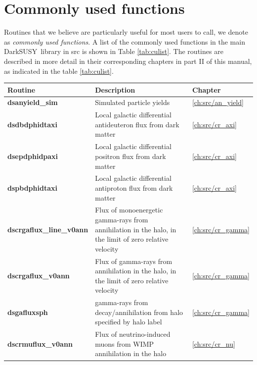 \documentclass[a4paper,10pt,oneside]{book}
\newcommand{\code}[1]{\ft{#1}}
\newcommand{\ds}{{\sffamily DarkSUSY}}
\newcommand{\ft}[1]{\textsf{#1}}
\newcommand{\ftb}[1]{{\bfseries \sffamily #1}}
\begin{document}
\section{Commonly used functions}

Routines that we believe are particularly  useful for most users to call, we denote 
as \emph{commonly used functions}. A list of the commonly used functions in the main \ds\ library in \code{src} is 
shown in Table \ref{tab:culist}. The routines are described in more detail in their corresponding chapters in part II of 
this manual, as indicated in the table \ref{tab:culist}. 

\bigskip

\begin{table}[!h]
\begin{tabular}{lp{8.5cm}l}
{\bfseries Routine} & {\bfseries Description} & {\bfseries Chapter} \\
\hline
\ftb{dsanyield\_sim} \index[routines]{dsanyield\_sim} &  Simulated particle yields & \ref{ch:src/an_yield} \\
\ftb{dsdbdphidtaxi} \index[routines]{dsdbdphidtaxi} &  Local galactic differential antideuteron flux from dark matter & \ref{ch:src/cr_axi} \\
\ftb{dsepdphidpaxi} \index[routines]{dsepdphidpaxi} &  Local galactic differential positron flux from dark matter & \ref{ch:src/cr_axi} \\
\ftb{dspbdphidtaxi} \index[routines]{dspbdphidtaxi} &  Local galactic differential antiproton flux from dark matter & \ref{ch:src/cr_axi} \\
\ftb{dscrgaflux\_line\_v0ann} \index[routines]{dscrgaflux\_line\_v0ann} &  Flux of monoenergetic gamma-rays from annihilation in the halo,  in the limit of zero relative velocity & \ref{ch:src/cr_gamma} \\
\ftb{dscrgaflux\_v0ann} \index[routines]{dscrgaflux\_v0ann} &  Flux of gamma-rays from annihilation in the halo, in the limit of zero relative velocity & \ref{ch:src/cr_gamma} \\
\ftb{dsgafluxsph} \index[routines]{dsgafluxsph} &  gamma-rays from decay/annihilation from halo specified by halo label & \ref{ch:src/cr_gamma} \\
\ftb{dscrmuflux\_v0ann} \index[routines]{dscrmuflux\_v0ann} &  Flux of neutrino-induced muons from WIMP annihilation in the halo & \ref{ch:src/cr_nu} \\

\end{tabular}
\end{table}
\end{document}
